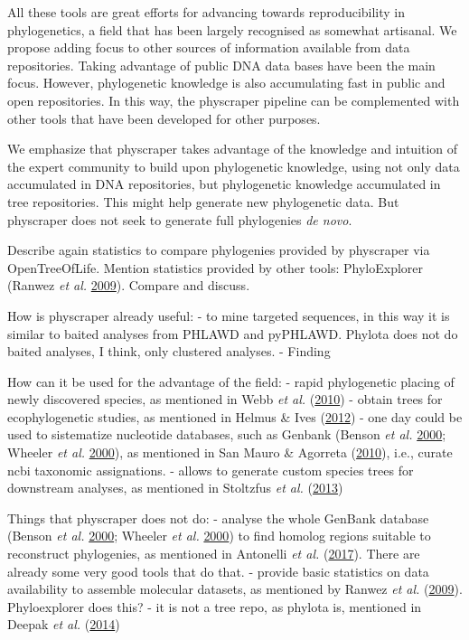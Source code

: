 \documentclass[]{article}
\begin{document}
All these tools are great efforts for advancing towards reproducibility in phylogenetics,
a field that has been largely recognised as somewhat artisanal.
We propose adding focus to other sources of information available from data repositories.
Taking advantage of public DNA data bases have been the main focus. However, phylogenetic knowledge is
also accumulating fast in public and open repositories.
In this way, the physcraper pipeline can be complemented with other tools that have
been developed for other purposes.

We emphasize that physcraper takes advantage of the knowledge and intuition of the expert
community to build upon phylogenetic knowledge, using not only data accumulated in
DNA repositories, but phylogenetic knowledge accumulated in tree repositories.
This might help generate new phylogenetic data. But physcraper does not seek to generate full phylogenies \emph{de novo}.

Describe again statistics to compare phylogenies provided by physcraper via OpenTreeOfLife.
Mention statistics provided by other tools: PhyloExplorer (Ranwez \emph{et al.} \protect\hyperlink{ref-ranwez2009phyloexplorer}{2009}).
Compare and discuss.

How is physcraper already useful:
- to mine targeted sequences, in this way it is similar to baited analyses from PHLAWD and pyPHLAWD. Phylota does not do baited analyses, I think, only clustered analyses.
- Finding

How can it be used for the advantage of the field:
- rapid phylogenetic placing of newly discovered species, as mentioned in Webb \emph{et al.} (\protect\hyperlink{ref-webb2010biodiversity}{2010})
- obtain trees for ecophylogenetic studies, as mentioned in Helmus \& Ives (\protect\hyperlink{ref-helmus2012phylogenetic}{2012})
- one day could be used to sistematize nucleotide databases, such as Genbank (Benson \emph{et al.} \protect\hyperlink{ref-benson2000genbank}{2000}; Wheeler \emph{et al.} \protect\hyperlink{ref-wheeler2000database}{2000}), as mentioned in San Mauro \& Agorreta (\protect\hyperlink{ref-san2010molecular}{2010}), i.e., curate ncbi taxonomic assignations.
- allows to generate custom species trees for downstream analyses, as mentioned in Stoltzfus \emph{et al.} (\protect\hyperlink{ref-stoltzfus2013phylotastic}{2013})

Things that physcraper does not do:
- analyse the whole GenBank database (Benson \emph{et al.} \protect\hyperlink{ref-benson2000genbank}{2000}; Wheeler \emph{et al.} \protect\hyperlink{ref-wheeler2000database}{2000}) to find homolog regions suitable to reconstruct phylogenies, as mentioned in Antonelli \emph{et al.} (\protect\hyperlink{ref-antonelli2017toward}{2017}). There are already some very good tools that do that.
- provide basic statistics on data availability to assemble molecular datasets, as mentioned by Ranwez \emph{et al.} (\protect\hyperlink{ref-ranwez2009phyloexplorer}{2009}). Phyloexplorer does this?
- it is not a tree repo, as phylota is, mentioned in Deepak \emph{et al.} (\protect\hyperlink{ref-deepak2014evominer}{2014})
\end{document}
